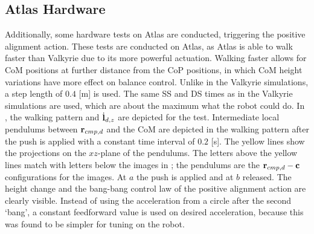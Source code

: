 \subsection{Atlas Hardware}
Additionally, some hardware tests on Atlas are conducted, triggering the positive alignment action. These tests are conducted on Atlas, as Atlas is able to walk faster than Valkyrie due to its more powerful actuation. Walking faster allows for \ac{CoM} positions at further distance from the \ac{CoP} positions, in which \ac{CoM} height variations have more effect on balance control. Unlike in the Valkyrie simulations, a step length of $0.4$ [m] is used. The same \ac{SS} and \ac{DS} times as in the Valkyrie simulations are used, which are about the maximum what the robot could do. In , the walking pattern and $\dot{\mathbf{l}}_{d,z}$ are depicted for the test. Intermediate local pendulums between $\mathbf{r}_{cmp,d}$ and the \ac{CoM} are depicted in the walking pattern after the push is applied with a constant time interval of $0.2$ [s]. The yellow lines show the projections on the $xz$-plane of the pendulums. The letters above the yellow lines match with letters below the images in ; the pendulums are the $\mathbf{r}_{cmp,d}-\mathbf{c}$ configurations for the images. At $a$ the push is applied and at $b$ released. The height change and the bang-bang control law of the positive alignment action are clearly visible. Instead of using the acceleration from a circle after the second `bang', a constant feedforward value is used on desired acceleration, because this was found to be simpler for tuning on the robot.
